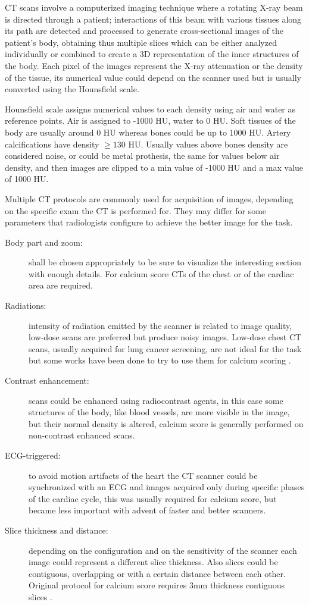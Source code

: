 CT scans involve a computerized imaging technique where a rotating X-ray beam is directed through a patient; interactions of this beam with various tissues along its path are detected and processed to generate cross-sectional images of the patient's body, obtaining thus multiple slices which can be either analyzed individually or combined to create a 3D representation of the inner structures of the body.
Each pixel of the images represent the X-ray attenuation or the density of the tissue, its numerical value could depend on the scanner used but is usually converted using the Hounsfield scale.

Hounsfield scale assigns numerical values to each density using air and water as reference points. Air is assigned to -1000 HU, water to 0 HU.
Soft tissues of the body are usually around 0 HU whereas bones could be up to 1000 HU. Artery calcifications have density $\ge 130$ HU.
Usually values above bones density are considered noise, or could be metal prothesis, the same for values below air density, and then images are clipped to a min value of -1000 HU and a max value of 1000 HU.

Multiple CT protocols are commonly used for acquisition of images, depending on the specific exam the CT is performed for.
They may differ for some parameters that radiologists configure to achieve the better image for the task.
\begin{description}
    \item[Body part and zoom:] shall be chosen appropriately to be sure to visualize the interesting section with enough details.
    For calcium score CTs of the chest or of the cardiac area are required.
    \item[Radiations:] intensity of radiation emitted by the scanner is related to image quality, low-dose scans are preferred but produce noisy images.
    Low-dose chest CT scans, usually acquired for lung cancer screening, are not ideal for the task but some works have been done to try to use them for calcium scoring \cite{Lessmann_2018}.
    \item[Contrast enhancement:] scans could be enhanced using radiocontrast agents, in this case some structures of the body, like blood vessels, are more visible in the image, but their normal density is altered, calcium score is generally performed on non-contrast enhanced scans.
    \item[ECG-triggered:] to avoid motion artifacts of the heart the CT scanner could be synchronized with an ECG and images acquired only during specific phases of the cardiac cycle, this was usually required for calcium score, but became less important with advent of faster and better scanners.
    \item[Slice thickness and distance:] depending on the configuration and on the sensitivity of the scanner each image could represent a different slice thickness.
    Also slices could be contiguous, overlapping or with a certain distance between each other.
    Original protocol for calcium score requires 3mm thickness contiguous slices \cite{AGATSTON1990827}.
\end{description}

